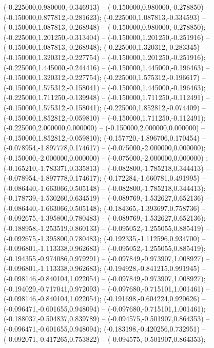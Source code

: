  (-0.225000,0.980000,-0.346913) -- (-0.150000,0.980000,-0.278850) -- (-0.150000,0.877812,-0.281623);
 (-0.225000,1.087813,-0.334593) -- (-0.150000,1.087813,-0.268948) -- (-0.150000,0.980000,-0.278850);
 (-0.225000,1.201250,-0.313404) -- (-0.150000,1.201250,-0.251916) -- (-0.150000,1.087813,-0.268948);
 (-0.225000,1.320312,-0.283345) -- (-0.150000,1.320312,-0.227754) -- (-0.150000,1.201250,-0.251916);
 (-0.225000,1.445000,-0.244416) -- (-0.150000,1.445000,-0.196463) -- (-0.150000,1.320312,-0.227754);
 (-0.225000,1.575312,-0.196617) -- (-0.150000,1.575312,-0.158041) -- (-0.150000,1.445000,-0.196463);
 (-0.225000,1.711250,-0.139948) -- (-0.150000,1.711250,-0.112491) -- (-0.150000,1.575312,-0.158041);
 (-0.225000,1.852812,-0.074409) -- (-0.150000,1.852812,-0.059810) -- (-0.150000,1.711250,-0.112491);
 (-0.225000,2.000000,0.000000) -- (-0.150000,2.000000,0.000000) -- (-0.150000,1.852812,-0.059810);
 (-0.157720,-1.896706,0.170454) -- (-0.078954,-1.897778,0.174617) -- (-0.075000,-2.000000,0.000000);
 (-0.150000,-2.000000,0.000000) -- (-0.075000,-2.000000,0.000000) ;
 (-0.165210,-1.783371,0.335813) -- (-0.082800,-1.785218,0.344413) -- (-0.078954,-1.897778,0.174617);
 (-0.172284,-1.660781,0.491995) -- (-0.086440,-1.663066,0.505148) -- (-0.082800,-1.785218,0.344413);
 (-0.178739,-1.530260,0.634519) -- (-0.089769,-1.532627,0.652136) -- (-0.086440,-1.663066,0.505148);
 (-0.184365,-1.393697,0.758736) -- (-0.092675,-1.395800,0.780483) -- (-0.089769,-1.532627,0.652136);
 (-0.188958,-1.253519,0.860133) -- (-0.095052,-1.255055,0.885419) -- (-0.092675,-1.395800,0.780483);
 (-0.192335,-1.112596,0.934700) -- (-0.096801,-1.113338,0.962683) -- (-0.095052,-1.255055,0.885419);
 (-0.194355,-0.974086,0.979291) -- (-0.097849,-0.973907,1.008927) -- (-0.096801,-1.113338,0.962683);
 (-0.194928,-0.841215,0.991945) -- (-0.098146,-0.840104,1.022054) -- (-0.097849,-0.973907,1.008927);
 (-0.194029,-0.717041,0.972093) -- (-0.097680,-0.715101,1.001461) -- (-0.098146,-0.840104,1.022054);
 (-0.191698,-0.604224,0.920626) -- (-0.096471,-0.601655,0.948094) -- (-0.097680,-0.715101,1.001461);
 (-0.188037,-0.504837,0.839789) -- (-0.094575,-0.501907,0.864353) -- (-0.096471,-0.601655,0.948094);
 (-0.183198,-0.420256,0.732951) -- (-0.092071,-0.417265,0.753822) -- (-0.094575,-0.501907,0.864353);
